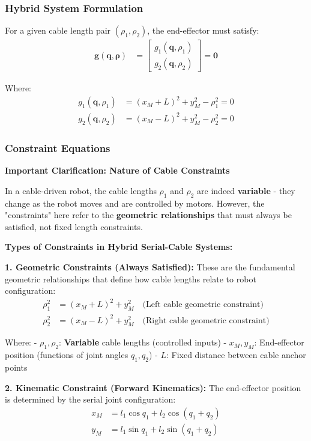 \documentclass[11pt,a4paper]{article}
\begin{document}
\subsubsection{Hybrid System Formulation}
For a given cable length pair $(\rho_1, \rho_2)$, the end-effector must satisfy:
\begin{align}
\bm{g}(\bm{q}, \bm{\rho}) &= \begin{bmatrix} g_1(\bm{q}, \rho_1) \\ g_2(\bm{q}, \rho_2) \end{bmatrix} = \bm{0}
\end{align}

Where:
\begin{align}
g_1(\bm{q}, \rho_1) &= (x_M + L)^2 + y_M^2 - \rho_1^2 = 0 \\
g_2(\bm{q}, \rho_2) &= (x_M - L)^2 + y_M^2 - \rho_2^2 = 0
\end{align}

\subsubsection{Constraint Equations}

\textbf{Important Clarification: Nature of Cable Constraints}

In a cable-driven robot, the cable lengths $\rho_1$ and $\rho_2$ are indeed \textbf{variable} - they change as the robot moves and are controlled by motors. However, the "constraints" here refer to the \textbf{geometric relationships} that must always be satisfied, not fixed length constraints.

\textbf{Types of Constraints in Hybrid Serial-Cable Systems:}

\textbf{1. Geometric Constraints (Always Satisfied):}
These are the fundamental geometric relationships that define how cable lengths relate to robot configuration:
\begin{align}
\rho_1^2 &= (x_M + L)^2 + y_M^2 \quad \text{(Left cable geometric constraint)} \\
\rho_2^2 &= (x_M - L)^2 + y_M^2 \quad \text{(Right cable geometric constraint)}
\end{align}

Where:
- $\rho_1, \rho_2$: \textbf{Variable} cable lengths (controlled inputs)
- $x_M, y_M$: End-effector position (functions of joint angles $q_1, q_2$)
- $L$: Fixed distance between cable anchor points

\textbf{2. Kinematic Constraint (Forward Kinematics):}
The end-effector position is determined by the serial joint configuration:
\begin{align}
x_M &= l_1\cos q_1 + l_2\cos(q_1 + q_2) \\
y_M &= l_1\sin q_1 + l_2\sin(q_1 + q_2)
\end{align}
\end{document}
